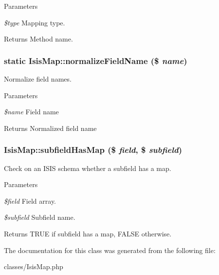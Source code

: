 \begin{DoxyParams}{Parameters}
\item[{\em \$type}]Mapping type.\end{DoxyParams}
\begin{DoxyReturn}{Returns}
Method name. 
\end{DoxyReturn}
\hypertarget{classIsisMap_ae2abf0591a4862f537fa23537ffca705}{
\subsubsection[{normalizeFieldName}]{\setlength{\rightskip}{0pt plus 5cm}static IsisMap::normalizeFieldName (\$ {\em name})}}
\label{classIsisMap_ae2abf0591a4862f537fa23537ffca705}
Normalize field names.


\begin{DoxyParams}{Parameters}
\item[{\em \$name}]Field name\end{DoxyParams}
\begin{DoxyReturn}{Returns}
Normalized field name 
\end{DoxyReturn}
\hypertarget{classIsisMap_ab5493af644e529c11a3c3e6edc37c3b9}{
\subsubsection[{subfieldHasMap}]{\setlength{\rightskip}{0pt plus 5cm}IsisMap::subfieldHasMap (\$ {\em field}, \/  \$ {\em subfield})}}
\label{classIsisMap_ab5493af644e529c11a3c3e6edc37c3b9}
Check on an ISIS schema whether a subfield has a map.


\begin{DoxyParams}{Parameters}
\item[{\em \$field}]Field array.\item[{\em \$subfield}]Subfield name.\end{DoxyParams}
\begin{DoxyReturn}{Returns}
TRUE if subfield has a map, FALSE otherwise. 
\end{DoxyReturn}


The documentation for this class was generated from the following file:\begin{DoxyCompactItemize}
\item 
classes/IsisMap.php\end{DoxyCompactItemize}
